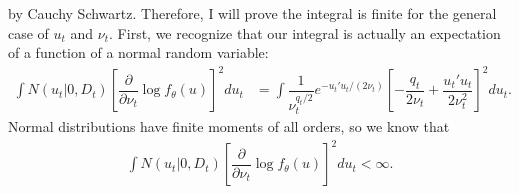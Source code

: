 \documentclass{article}
\begin{document}
by Cauchy Schwartz.  Therefore, I will prove the integral is finite for the general case of $u_t$ and $\nu_t$. First, we recognize that our integral is actually an expectation of a function of a normal random variable:
\begin{align}
\int N(u_t|0,D_t) \left[  \dfrac{\partial}{\partial \nu_t} \log f_\theta(u)  \right]^2 du_t &=
\int \dfrac{1}{\nu_t^{q_t/2}} e^{-u_t'u_t/(2 \nu_t)} \left[ -\dfrac{q_t}{2 \nu_t} + \dfrac{u_t'u_t}{2 \nu_t^2}  \right]^2 du_t .
\end{align}
Normal distributions have finite moments of all orders, so we know that\begin{align}
\int N(u_t|0,D_t) \left[  \dfrac{\partial}{\partial \nu_t} \log f_\theta(u)  \right]^2 du_t < \infty.
\end{align}
\end{document}
